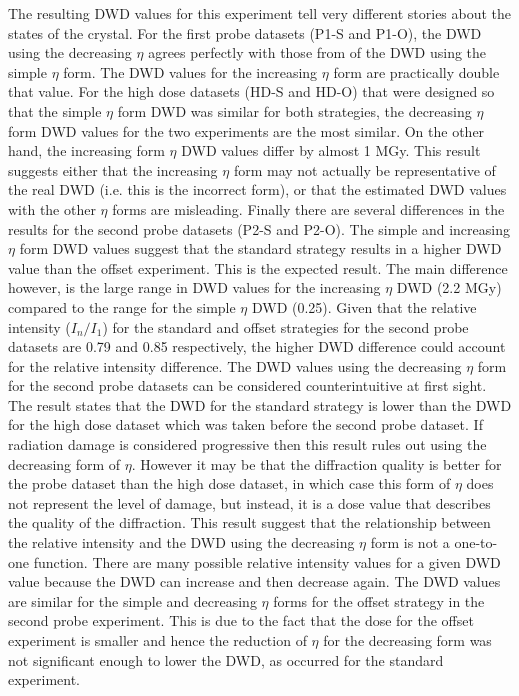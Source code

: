 The resulting DWD values for this experiment tell very different stories about the states of the crystal.
For the first probe datasets (P1-S and P1-O), the DWD using the decreasing $\eta$ agrees perfectly with those from of the DWD using the simple $\eta$ form.
The DWD values for the increasing $\eta$ form are practically double that value.
For the high dose datasets (HD-S and HD-O) that were designed so that the simple $\eta$ form DWD was similar for both strategies, the decreasing $\eta$ form DWD values for the two experiments are the most similar.
On the other hand, the increasing form $\eta$ DWD values differ by almost 1 MGy.
This result suggests either that the increasing $\eta$ form may not actually be representative of the real DWD (i.e. this is the incorrect form), or that the estimated DWD values with the other $\eta$ forms are misleading.
Finally there are several differences in the results for the second probe datasets (P2-S and P2-O).
The simple and increasing $\eta$ form DWD values suggest that the standard strategy results in a higher DWD value than the offset experiment.
This is the expected result.
The main difference however, is the large range in DWD values for the increasing $\eta$ DWD (2.2 MGy) compared to the range for the simple $\eta$ DWD (0.25).
Given that the relative intensity ($I_{n}/I_{1}$) for the standard and offset strategies for the second probe datasets are 0.79 and 0.85 respectively, the higher DWD difference could account for the relative intensity difference.
The DWD values using the decreasing $\eta$ form for the second probe datasets can be considered counterintuitive at first sight.
The result states that the DWD for the standard strategy is lower than the DWD for the high dose dataset which was taken before the second probe dataset.
If radiation damage is considered progressive then this result rules out using the decreasing form of $\eta$.
However it may be that the diffraction quality is better for the probe dataset than the high dose dataset, in which case this form of $\eta$ does not represent the level of damage, but instead, it is a dose value that describes the quality of the diffraction.
This result suggest that the relationship between the relative intensity and the DWD using the decreasing $\eta$ form is not a one-to-one function.
There are many possible relative intensity values for a given DWD value because the DWD can increase and then decrease again.
The DWD values are similar for the simple and decreasing $\eta$ forms for the offset strategy in the second probe experiment.
This is due to the fact that the dose for the offset experiment is smaller and hence the reduction of $\eta$ for the decreasing form was not significant enough to lower the DWD, as occurred for the standard experiment.
